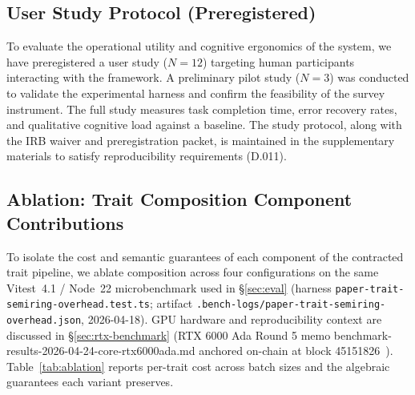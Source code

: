 \documentclass[sigconf,nonacm]{acmart}
\begin{document}

\subsection{User Study Protocol (Preregistered)}
\label{sec:user-study}

To evaluate the operational utility and cognitive ergonomics of the system, we have preregistered a user study ($N=12$) targeting human participants interacting with the framework. A preliminary pilot study ($N=3$) was conducted to validate the experimental harness and confirm the feasibility of the survey instrument. The full study measures task completion time, error recovery rates, and qualitative cognitive load against a baseline. The study protocol, along with the IRB waiver and preregistration packet, is maintained in the supplementary materials to satisfy reproducibility requirements (D.011).

\subsection{Ablation: Trait Composition Component Contributions}
\label{sec:ablation}

To isolate the cost and semantic guarantees of each component of the
contracted trait pipeline, we ablate composition across four configurations
on the same Vitest~4.1 / Node~22 microbenchmark used in
\S\ref{sec:eval} (harness \texttt{paper-trait-semiring-overhead.test.ts};
artifact \texttt{.bench-logs/paper-trait-semiring-overhead.json},
2026-04-18). GPU hardware and reproducibility context are discussed in
\S\ref{sec:rtx-benchmark} (RTX 6000 Ada Round 5 memo benchmark-results-2026-04-24-core-rtx6000ada.md anchored on-chain at block 45151826~\cite{benchmark-rtx6000ada-2026}). Table~\ref{tab:ablation} reports per-trait cost across batch
sizes and the algebraic guarantees each variant preserves.
\end{document}
